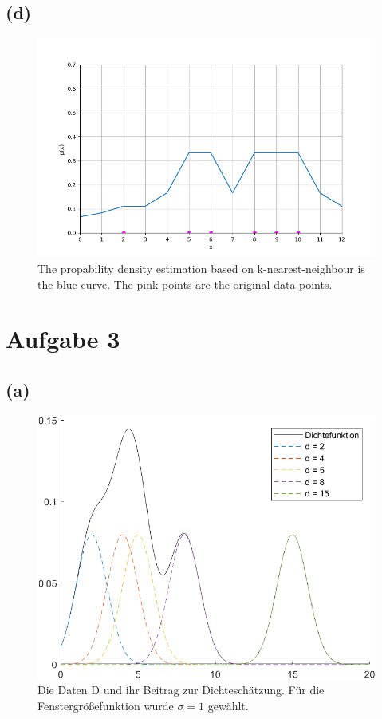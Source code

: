 \documentclass[a4paper]{scrartcl}
\begin{document}
\subsection*{(d)} 
\begin{figure}[H]
	\includegraphics*[scale=.8]{assignment6_data/plots/q2d_plot.png}
	\caption{The propability density estimation based on k-nearest-neighbour is the blue curve. The pink points are the original data points.}
\end{figure}




\section*{Aufgabe 3}
\subsection*{(a)}
\begin{figure}[H]
	\includegraphics*[scale=1.1]{assignment6_data/plots/3a.png}
	\caption{Die Daten D und ihr Beitrag zur Dichteschätzung. Für die Fenstergrößefunktion wurde $\sigma = 1$ gewählt.}
\end{figure}
\end{document}
